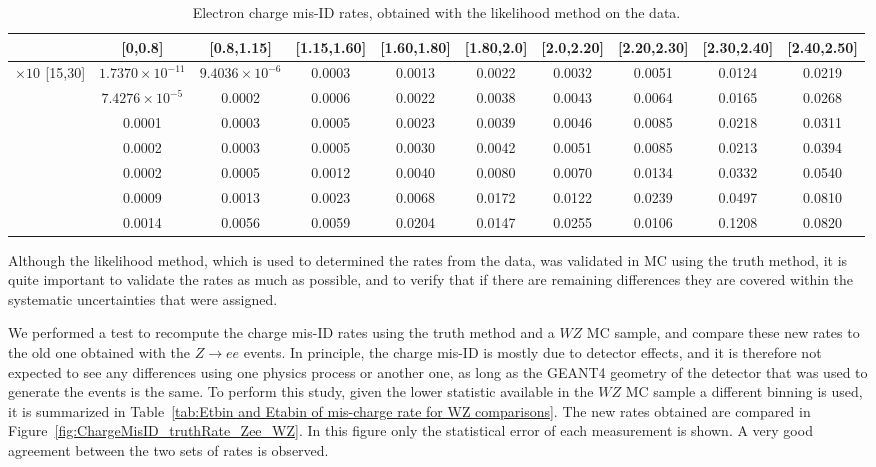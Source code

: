 \begin{table}
\footnotesize
\centering
\begin{tabular}{c|c|c|c|c|c|c|c|c|c}
  \hline
  \backslashbox{\pt[\GeV]}{$|$\eta$|$} &[0,0.8] &[0.8,1.15] &[1.15,1.60] &[1.60,1.80] &[1.80,2.0] &[2.0,2.20] &[2.20,2.30] &[2.30,2.40] &[2.40,2.50] \\
  \hline
  $ \times 10^{}$
  [15,30] &$1.7370\times 10^{-11}$ &$9.4036\times 10^{-6}$ &0.0003 &0.0013 &0.0022 &0.0032 &0.0051 &0.0124 &0.0219\\
  \hline
  [30,40] &$7.4276\times 10^{-5}$ &0.0002 &0.0006 &0.0022 &0.0038 &0.0043 &0.0064 &0.0165 &0.0268 \\
  \hline
  [40,50] &0.0001 &0.0003 &0.0005 &0.0023 &0.0039 &0.0046 &0.0085 &0.0218 &0.0311 \\
  \hline
  [50,60] &0.0002 &0.0003 &0.0005 &0.0030 &0.0042 &0.0051 &0.0085 &0.0213 &0.0394 \\
  \hline
  [60,80] &0.0002 &0.0005 &0.0012 &0.0040 &0.0080 &0.0070 &0.0134 &0.0332 &0.0540 \\
  \hline
  [80,120] &0.0009 &0.0013 &0.0023 &0.0068 &0.0172 &0.0122 &0.0239 &0.0497 &0.0810 \\
  \hline
  [120,1000] &0.0014 &0.0056 &0.0059 &0.0204 &0.0147 &0.0255 &0.0106 &0.1208 &0.0820  \\
  \hline
\end{tabular}
\caption{Electron charge mis-ID rates, obtained with the likelihood method on the data.}
\label{tab:LL_finalRates}
\end{table}




Although the likelihood method, which is used to determined the rates from the data, was validated in MC using the truth method, it is quite important to validate the rates as much as possible, and to verify that if there are remaining differences they are covered within the systematic uncertainties that were assigned.


We performed a test to recompute the charge mis-ID rates using the truth method and a $WZ$ MC sample, and compare these new rates to the old one obtained with the $Z\to{}ee$ events. In principle, the charge mis-ID is mostly due to detector effects, and it is therefore not expected to see any differences using one physics process or another one, as long as the GEANT4 geometry of the detector that was used to generate the events is the same. To perform this study, given the lower statistic available in the $WZ$ MC sample a different binning is used, it is summarized in Table~\ref{tab:Etbin and Etabin of mis-charge rate for WZ comparisons}. The new rates obtained are compared in Figure~\ref{fig:ChargeMisID_truthRate_Zee_WZ}. In this figure only the statistical error of each measurement is shown. A very good agreement between the two sets of rates is observed.



